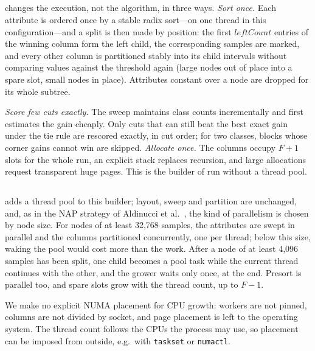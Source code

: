 \subsection{\ImplSerialOpt}
\label{sec:impl-serial}

\ImplSerialOpt{} changes the execution, not the algorithm, in three ways. \emph{Sort once.} Each attribute is ordered once by a stable radix sort---on one thread in this configuration---and a split is then made by position: the first $leftCount$ entries of the winning column form the left child, the corresponding samples are marked, and every other column is partitioned stably into its child intervals without comparing values against the threshold again (large nodes out of place into a spare slot, small nodes in place). Attributes constant over a node are dropped for its whole subtree.

\emph{Score few cuts exactly.} The sweep maintains class counts incrementally and first estimates the gain cheaply. Only cuts that can still beat the best exact gain under the tie rule are rescored exactly, in cut order; for two classes, blocks whose corner gains cannot win are skipped. \emph{Allocate once.} The columns occupy $F+1$ slots for the whole run, an explicit stack replaces recursion, and large allocations request transparent huge pages. This is the builder of \ImplParallel{} run without a thread pool.

\subsection{\ImplParallel}
\label{sec:impl-parallel}

\ImplParallel{} adds a thread pool to this builder; layout, sweep and partition are unchanged, and, as in the NAP strategy of Aldinucci et al.~\cite{aldinucci2014fastflow}, the kind of parallelism is chosen by node size. For nodes of at least 32{,}768 samples, the attributes are swept in parallel and the columns partitioned concurrently, one per thread; below this size, waking the pool would cost more than the work. After a node of at least 4{,}096 samples has been split, one child becomes a pool task while the current thread continues with the other, and the grower waits only once, at the end. Presort is parallel too, and spare slots grow with the thread count, up to $F-1$.

We make no explicit NUMA placement for CPU growth: workers are not pinned, columns are not divided by socket, and page placement is left to the operating system. The thread count follows the CPUs the process may use, so placement can be imposed from outside, e.g.\ with \texttt{taskset} or \texttt{numactl}.

